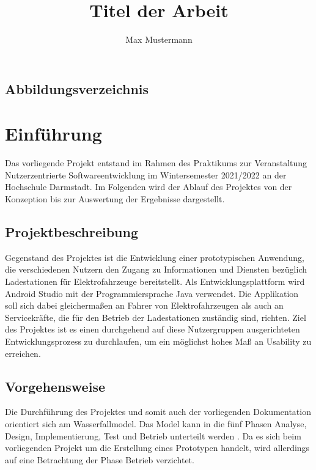 \documentclass[12pt, a4paper, oneside]{article}
\title{\textbf{Titel der Arbeit}}
\author{Max Mustermann}
\newcounter{SeitenzahlSpeicher}
\begin{document}


\begin{spacing}{1}
\setcounter{page}{2}
\tableofcontents
\end{spacing}
\newpage
\begin{spacing}{1}
\section*{Abbildungsverzeichnis} 
\renewcommand{\listfigurename}{}
\listoffigures
\end{spacing}
\newpage
\clearpage
\setcounter{SeitenzahlSpeicher}{\value{page}}
\newpage
{}

\section{Einführung}
Das vorliegende Projekt entstand im Rahmen des Praktikums zur Veranstaltung Nutzerzentrierte Softwareentwicklung im Wintersemester 2021/2022 an der Hochschule Darmstadt. Im Folgenden wird der Ablauf des Projektes von der Konzeption bis zur Auswertung der Ergebnisse dargestellt.

\subsection{Projektbeschreibung}
Gegenstand des Projektes ist die Entwicklung einer prototypischen Anwendung, die verschiedenen Nutzern den Zugang zu Informationen und Diensten bezüglich Ladestationen für Elektrofahrzeuge bereitstellt. Als Entwicklungsplattform wird Android Studio mit der Programmiersprache Java verwendet. Die Applikation soll sich dabei gleichermaßen an Fahrer von Elektrofahrzeugen als auch an Servicekräfte, die für den Betrieb der Ladestationen zuständig sind, richten. Ziel des Projektes ist es einen durchgehend auf diese Nutzergruppen ausgerichteten Entwicklungsprozess zu durchlaufen, um ein möglichst hohes Maß an Usability zu erreichen.

\subsection{Vorgehensweise}
Die Durchführung des Projektes und somit auch der vorliegenden Dokumentation orientiert sich am Wasserfallmodel. Das Model kann in die fünf Phasen Analyse, Design, Implementierung, Test und Betrieb unterteilt werden \cite[S. 16 ff.]{SoftwareDevelopmentBestPractices}. Da es sich beim vorliegenden Projekt um die Erstellung eines Prototypen handelt, wird allerdings auf eine Betrachtung der Phase Betrieb verzichtet.\\
\end{document}
